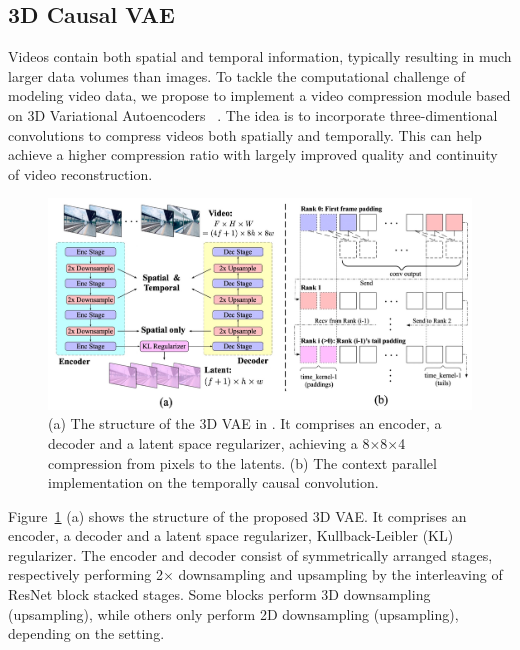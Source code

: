 \subsection{3D Causal VAE} 


Videos contain both spatial and temporal information, typically resulting in much larger data volumes than images.
To tackle the computational challenge of modeling video data, we propose to implement a video compression module based on 3D Variational Autoencoders ~\citep{yu2023language}.
The idea is to incorporate three-dimentional convolutions to compress videos both spatially and temporally. 
This can help achieve a higher compression ratio with largely improved quality and continuity of video reconstruction.%
\begin{figure}[h]
\begin{center}
\includegraphics[width=0.8\linewidth]{images/3dvae_combined.jpg}
\end{center}
\caption{(a) The structure of the 3D VAE in \model. It comprises an encoder, a decoder and a latent space regularizer, achieving a 8$\times$8$\times$4 compression from pixels to the latents. (b) The context parallel implementation on the temporally causal convolution.}
\label{fig:3dvae_combined}
\end{figure}

Figure~\ref{fig:3dvae_combined} (a) shows the structure of the proposed 3D VAE. 
It comprises an encoder, a decoder and a latent space regularizer, Kullback-Leibler (KL) regularizer. 
The encoder and decoder consist of symmetrically arranged stages, respectively performing 2$\times$ downsampling and upsampling by the interleaving of ResNet block stacked stages. Some blocks perform 3D downsampling (upsampling), while others only perform 2D downsampling (upsampling), depending on the setting.


